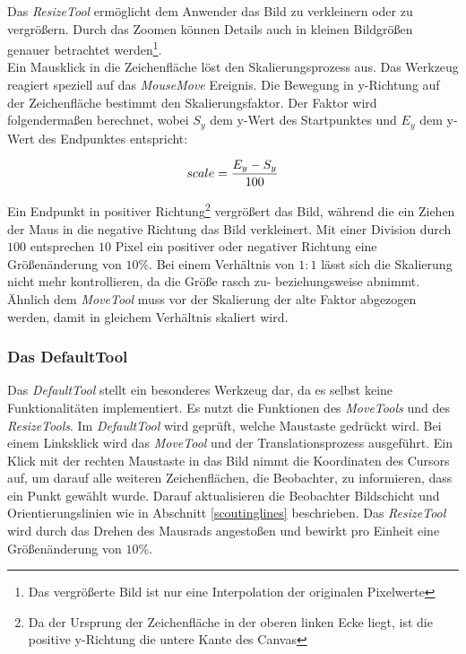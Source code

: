 Das \textit{ResizeTool} ermöglicht dem Anwender das Bild zu verkleinern oder zu vergrößern. Durch das Zoomen können Details auch in kleinen Bildgrößen genauer betrachtet werden\footnote{Das vergrößerte Bild ist nur eine Interpolation der originalen Pixelwerte}.\\
Ein Mausklick in die Zeichenfläche löst den Skalierungsprozess aus. Das Werkzeug reagiert speziell auf das \textit{MouseMove} Ereignis. Die Bewegung in y-Richtung auf der Zeichenfläche bestimmt den Skalierungsfaktor. Der Faktor wird folgendermaßen berechnet, wobei $S_y$ dem y-Wert des Startpunktes  und $E_y$ dem y-Wert des Endpunktes entspricht: 

\begin{equation}
scale = \frac{E_y - S_y}{100}
\vspace{0.5cm}
\end{equation}

Ein Endpunkt in positiver Richtung\footnote{Da der Ursprung der Zeichenfläche in der oberen linken Ecke liegt, ist die positive y-Richtung die untere Kante des Canvas} vergrößert das Bild, während die ein Ziehen der Maus in die negative Richtung das Bild verkleinert. Mit einer Division durch $100$ entsprechen $10$ Pixel ein positiver oder negativer Richtung eine Größenänderung von $10\%$. Bei einem Verhältnis von $1:1$ lässt sich die Skalierung nicht mehr kontrollieren, da die Größe rasch zu- beziehungsweise abnimmt.\\
Ähnlich dem \textit{MoveTool} muss vor der Skalierung der alte Faktor abgezogen werden, damit in gleichem Verhältnis skaliert wird.

\subsubsection{Das DefaultTool}

Das \textit{DefaultTool} stellt ein besonderes Werkzeug dar, da es selbst keine Funktionalitäten implementiert. Es nutzt die Funktionen des \textit{MoveTools} und des \textit{ResizeTools}. Im \textit{DefaultTool} wird geprüft, welche Maustaste gedrückt wird. Bei einem Linksklick wird das \textit{MoveTool} und der Translationsprozess ausgeführt. Ein Klick mit der rechten Maustaste in das Bild nimmt die Koordinaten des Cursors auf, um darauf alle weiteren Zeichenflächen, die Beobachter, zu informieren, dass ein Punkt gewählt wurde. Darauf aktualisieren die Beobachter Bildschicht und Orientierungslinien wie in Abschnitt \ref{scoutinglines} beschrieben. Das \textit{ResizeTool} wird durch das Drehen des Mausrads angestoßen und bewirkt pro Einheit eine Größenänderung von $10\%$.

